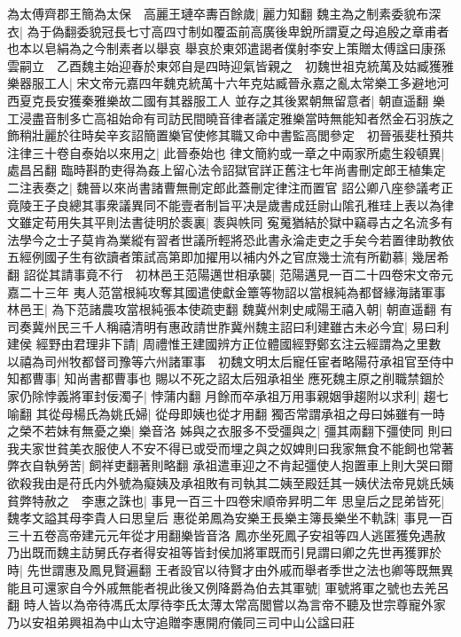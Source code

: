 為太傅齊郡王簡為太保　高麗王璉卒夀百餘歲|{
	麗力知翻}
魏主為之制素委貌布深衣|{
	為于偽翻委貌冠長七寸高四寸制如覆盃前高廣後卑銳所謂夏之母追殷之章甫者也本以皂絹為之今制素者以舉哀}
舉哀於東郊遣謁者僕射李安上策贈太傅諡曰康孫雲嗣立　乙酉魏主始迎春於東郊自是四時迎氣皆親之　初魏世祖克統萬及姑臧獲雅樂器服工人|{
	宋文帝元嘉四年魏克統萬十六年克姑臧晉永嘉之亂太常樂工多避地河西夏克長安獲秦雅樂故二國有其器服工人}
並存之其後累朝無留意者|{
	朝直遥翻}
樂工浸盡音制多亡高祖始命有司訪民間曉音律者議定雅樂當時無能知者然金石羽族之飾稍壯麗於往時矣辛亥詔簡置樂官使修其職又命中書監高閭參定　初晉張斐杜預共注律三十卷自泰始以來用之|{
	此晉泰始也}
律文簡約或一章之中兩家所處生殺頓異|{
	處昌呂翻}
臨時斟酌吏得為姦上留心法令詔獄官詳正舊注七年尚書刪定郎王植集定二注表奏之|{
	魏晉以來尚書諸曹無刪定郎此蓋刪定律注而置官}
詔公卿八座參議考正竟陵王子良總其事衆議異同不能壹者制旨平决是歲書成廷尉山隂孔稚珪上表以為律文雖定苟用失其平則法書徒明於袠裏|{
	袠與帙同}
寃䰟猶結於獄中竊尋古之名流多有法學今之士子莫肯為業縱有習者世議所輕將恐此書永淪走吏之手矣今若置律助教依五經例國子生有欲讀者策試高第即加擢用以補内外之官庶幾士流有所勸慕|{
	幾居希翻}
詔從其請事竟不行　初林邑王范陽邁世相承襲|{
	范陽邁見一百二十四卷宋文帝元嘉二十三年}
夷人范當根純攻奪其國遣使獻金簟等物詔以當根純為都督緣海諸軍事林邑王|{
	為下范諸農攻當根純張本使疏吏翻}
魏冀州刺史咸陽王禧入朝|{
	朝直遥翻}
有司奏冀州民三千人稱禧清明有惠政請世胙冀州魏主詔曰利建雖古未必今宜|{
	易曰利建侯}
經野由君理非下請|{
	周禮惟王建國辨方正位體國經野鄭玄注云經謂為之里數}
以禧為司州牧都督司豫等六州諸軍事　初魏文明太后寵任宦者略陽苻承祖官至侍中知都曹事|{
	知尚書都曹事也}
賜以不死之詔太后殂承祖坐應死魏主原之削職禁錮於家仍除悖義將軍封佞濁子|{
	悖蒲内翻}
月餘而卒承祖万用事親姻爭趨附以求利|{
	趨七喻翻}
其從母楊氏為姚氏婦|{
	從母即姨也從才用翻}
獨否常謂承祖之母曰姊雖有一時之榮不若妹有無憂之樂|{
	樂音洛}
姊與之衣服多不受彊與之|{
	彊其兩翻下彊使同}
則曰我夫家世貧美衣服使人不安不得已或受而埋之與之奴婢則曰我家無食不能飼也常著弊衣自執勞苦|{
	飼祥吏翻著則略翻}
承祖遣車迎之不肯起彊使人抱置車上則大哭曰爾欲殺我由是苻氏内外號為癡姨及承祖敗有司執其二姨至殿廷其一姨伏法帝見姚氏姨貧弊特赦之　李惠之誅也|{
	事見一百三十四卷宋順帝昇明二年}
思皇后之昆弟皆死|{
	魏孝文謚其母李貴人曰思皇后}
惠從弟鳳為安樂王長樂主簿長樂坐不軌誅|{
	事見一百三十五卷高帝建元元年從才用翻樂皆音洛}
鳳亦坐死鳳子安祖等四人逃匿獲免遇赦乃出既而魏主訪舅氏存者得安祖等皆封侯加將軍既而引見謂曰卿之先世再獲罪於時|{
	先世謂惠及鳳見賢遍翻}
王者設官以待賢才由外戚而舉者季世之法也卿等既無異能且可還家自今外戚無能者視此後又例降爵為伯去其軍號|{
	軍號將軍之號也去羌呂翻}
時人皆以為帝待馮氏太厚待李氏太薄太常高閭嘗以為言帝不聽及世宗尊寵外家乃以安祖弟興祖為中山太守追贈李惠開府儀同三司中山公諡曰莊

